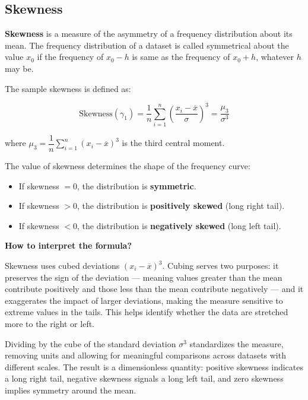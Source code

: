 \documentclass[twoside]{book}
\begin{document}
\subsection{Skewness}

\textbf{Skewness} is a measure of the asymmetry of a frequency distribution about its mean. The frequency distribution of a dataset is called symmetrical about the value $x_0$ if the frequency of $x_0-h$ is same as the frequency of $x_0+h$, whatever $h$ may be.


The sample skewness is defined as:
\begin{textbox}
\[
\text{Skewness} (\gamma_1) = \frac{1}{n} \sum_{i=1}^n \left( \frac{x_i - \overline{x}}{\sigma} \right)^3 = \frac{\mu_3}{\sigma^3}
\]
\end{textbox}
where \(\mu_3 = \dfrac{1}{n} \sum_{i=1}^n (x_i - \overline{x})^3\) is the third central moment.

The value of skewness determines the shape of the frequency curve:
\begin{itemize}
    \item If skewness \( = 0 \), the distribution is \textbf{symmetric}.
    \item If skewness \( > 0 \), the distribution is \textbf{positively skewed} (long right tail).
    \item If skewness \( < 0 \), the distribution is \textbf{negatively skewed} (long left tail).
\end{itemize}

\textbf{How to interpret the formula?}

Skewness uses cubed deviations $(x_i - \overline{x})^3$. Cubing serves two purposes: it preserves the sign of the deviation — meaning values greater than the mean contribute positively and those less than the mean contribute negatively — and it exaggerates the impact of larger deviations, making the measure sensitive to extreme values in the tails. This helps identify whether the data are stretched more to the right or left. 

Dividing by the cube of the standard deviation $\sigma^3$ standardizes the measure, removing units and allowing for meaningful comparisons across datasets with different scales. The result is a dimensionless quantity: positive skewness indicates a long right tail, negative skewness signals a long left tail, and zero skewness implies symmetry around the mean.
\end{document}

